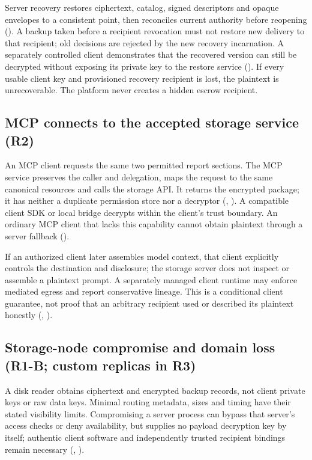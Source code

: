 Server recovery restores ciphertext, catalog, signed descriptors and opaque envelopes to a consistent point, then reconciles current authority before reopening (). A backup taken before a recipient revocation must not restore new delivery to that recipient; old decisions are rejected by the new recovery incarnation. A separately controlled client demonstrates that the recovered version can still be decrypted without exposing its private key to the restore service (). If every usable client key and provisioned recovery recipient is lost, the plaintext is unrecoverable. The platform never creates a hidden escrow recipient.

\subsection{MCP connects to the accepted storage service (R2)}
An MCP client requests the same two permitted report sections. The MCP service preserves the caller and delegation, maps the request to the same canonical resources and calls the storage API. It returns the encrypted package; it has neither a duplicate permission store nor a decryptor (, ). A compatible client SDK or local bridge decrypts within the client's trust boundary. An ordinary MCP client that lacks this capability cannot obtain plaintext through a server fallback ().

If an authorized client later assembles model context, that client explicitly controls the destination and disclosure; the storage server does not inspect or assemble a plaintext prompt. A separately managed client runtime may enforce mediated egress and report conservative lineage. This is a conditional client guarantee, not proof that an arbitrary recipient used or described its plaintext honestly (, ).

\subsection{Storage-node compromise and domain loss (R1-B; custom replicas in R3)}
A disk reader obtains ciphertext and encrypted backup records, not client private keys or raw data keys. Minimal routing metadata, sizes and timing have their stated visibility limits. Compromising a server process can bypass that server's access checks or deny availability, but supplies no payload decryption key by itself; authentic client software and independently trusted recipient bindings remain necessary (, ).

